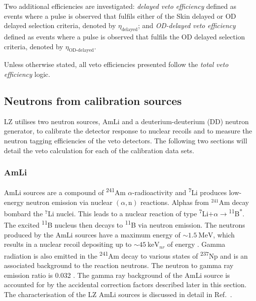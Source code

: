 Two additional efficiencies are investigated: \textit{delayed veto efficiency} defined as events where a pulse is observed that fulfils either of the Skin delayed or OD delayed selection criteria, denoted by $\eta_\text{delayed}$; and \textit{OD-delayed veto efficiency} defined as events where a pulse is observed that fulfils the OD delayed selection criteria, denoted by $\eta_\text{OD-delayed}$.

Unless otherwise stated, all veto efficiencies presented follow the \textit{total veto efficiency} logic.

\subsection{Neutrons from calibration sources}\label{sec:VetoEff/NeutronsFromCalibrationSources}
LZ utilises two neutron sources, AmLi and a deuterium-deuterium (DD) neutron generator, to calibrate the detector response to nuclear recoils and to measure the neutron tagging efficiencies of the veto detectors. The following two sections will detail the veto calculation for each of the calibration data sets.

\subsubsection{AmLi}\label{sec:VetoEff/AmLi_Efficiency}
AmLi sources are a compound of \textsuperscript{241}Am $\alpha$-radioactivity and \textsuperscript{7}Li produces low-energy neutron emission via nuclear $(\alpha,\text{n})$ reactions. Alphas from $^{241}$Am decay bombard the $^{7}$Li nuclei. This leads to a nuclear reaction of type \textsuperscript{7}Li$+\alpha \rightarrow$\textsuperscript{11}B\textsuperscript{*}. The excited \textsuperscript{11}B nucleus then decays to \textsuperscript{11}B via neutron emission. The neutrons produced by the AmLi sources have a maximum energy of $\sim1.5~\text{MeV}$, which results in a nuclear recoil depositing up to $\sim45~\text{keV}_{nr}$ of energy \cite{LZ:2024bsz}. Gamma radiation is also emitted in the \textsuperscript{241}Am decay to various states of \textsuperscript{237}Np and is an associated background to the reaction neutrons. The neutron to gamma ray emission ratio is 0.032 \cite{Sazzad:2023uqs}. The gamma ray background of the AmLi source is accounted for by the accidental correction factors described later in this section. The characterisation of the LZ AmLi sources is discussed in detail in Ref.~\cite{Sazzad:2023uqs}.

